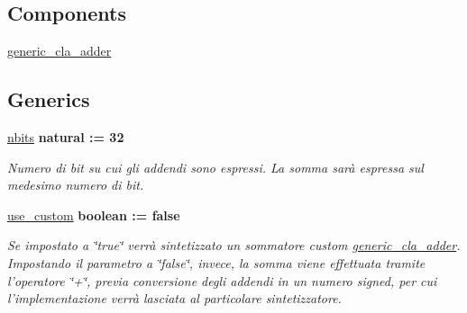\subsection*{Components}
 \begin{DoxyCompactItemize}
\item 
\hyperlink{group___adder_gae7148956d4ef1d1cd14f35060634b9c3}{generic\+\_\+cla\+\_\+adder}  {\bfseries }  
\end{DoxyCompactItemize}
\subsection*{Generics}
 \begin{DoxyCompactItemize}
\item 
\hyperlink{group___adder_gae1435c07d0cd54b521535e2f8de6f94e}{nbits} {\bfseries {\bfseries \textcolor{vhdlchar}{natural}\textcolor{vhdlchar}{ }\textcolor{vhdlchar}{ }\textcolor{vhdlchar}{\+:}\textcolor{vhdlchar}{=}\textcolor{vhdlchar}{ }\textcolor{vhdlchar}{ } \textcolor{vhdldigit}{32} \textcolor{vhdlchar}{ }}}
\begin{DoxyCompactList}\small\item\em Numero di bit su cui gli addendi sono espressi. La somma sarà espressa sul medesimo numero di bit. \end{DoxyCompactList}\item 
\hyperlink{group___adder_gadf05ca347ec6d3c85740dc697469b3db}{use\+\_\+custom} {\bfseries {\bfseries \textcolor{vhdlchar}{boolean}\textcolor{vhdlchar}{ }\textcolor{vhdlchar}{ }\textcolor{vhdlchar}{\+:}\textcolor{vhdlchar}{=}\textcolor{vhdlchar}{ }\textcolor{vhdlchar}{ }\textcolor{vhdlchar}{ }\textcolor{vhdlchar}{ }\textcolor{vhdlchar}{false}\textcolor{vhdlchar}{ }}}
\begin{DoxyCompactList}\small\item\em Se impostato a \char`\"{}true\char`\"{} verrà sintetizzato un sommatore custom \hyperlink{classgeneric__cla__adder}{generic\+\_\+cla\+\_\+adder}. Impostando il parametro a \char`\"{}false\char`\"{}, invece, la somma viene effettuata tramite l'operatore \char`\"{}+\char`\"{}, previa conversione degli addendi in un numero signed, per cui l'implementazione verrà lasciata al particolare sintetizzatore. \end{DoxyCompactList}\end{DoxyCompactItemize}
